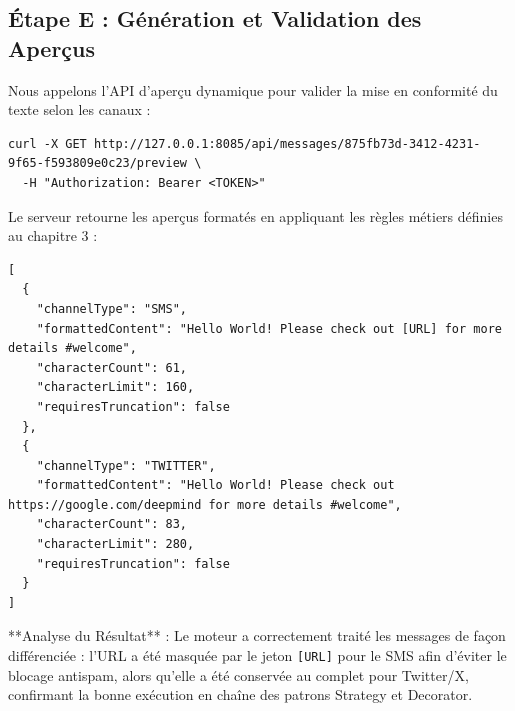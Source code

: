 \subsection{Étape E : Génération et Validation des Aperçus}
Nous appelons l'API d'aperçu dynamique pour valider la mise en conformité du texte selon les canaux :
\begin{lstlisting}[basicstyle=\footnotesize\ttfamily, frame=single]
curl -X GET http://127.0.0.1:8085/api/messages/875fb73d-3412-4231-9f65-f593809e0c23/preview \
  -H "Authorization: Bearer <TOKEN>"
\end{lstlisting}

Le serveur retourne les aperçus formatés en appliquant les règles métiers définies au chapitre 3 :
\begin{lstlisting}[basicstyle=\footnotesize\ttfamily, frame=single]
[
  {
    "channelType": "SMS",
    "formattedContent": "Hello World! Please check out [URL] for more details #welcome",
    "characterCount": 61,
    "characterLimit": 160,
    "requiresTruncation": false
  },
  {
    "channelType": "TWITTER",
    "formattedContent": "Hello World! Please check out https://google.com/deepmind for more details #welcome",
    "characterCount": 83,
    "characterLimit": 280,
    "requiresTruncation": false
  }
]
\end{lstlisting}

**Analyse du Résultat** : 
Le moteur a correctement traité les messages de façon différenciée : l'URL a été masquée par le jeton \texttt{[URL]} pour le SMS afin d'éviter le blocage antispam, alors qu'elle a été conservée au complet pour Twitter/X, confirmant la bonne exécution en chaîne des patrons Strategy et Decorator.